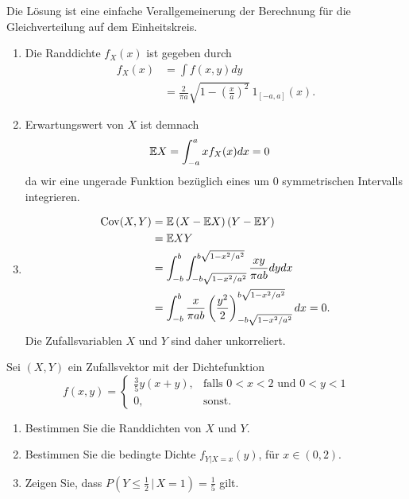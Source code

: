 \solution 
Die Lösung ist eine einfache Verallgemeinerung der Berechnung für die Gleichverteilung
auf dem Einheitskreis.
\begin{enumerate}
    \item Die Randdichte $f_{X}(x)$ ist gegeben durch
        \begin{align*}
            f_{X}(x) &= \int f(x,y) dy \\
            &= \frac{2}{\pi a} \sqrt{1- \left( \frac{x}{a} \right)^2} \ 1_{[-a,a]}(x).
        \end{align*}
    \item Erwartungswert von $X$ ist demnach
        \begin{align*}
            \mathbb{E} X &= \int_{-a}^{a} x f_{X}(x) dx = 0
        \end{align*}
        da wir eine ungerade Funktion bezüglich eines um $0$ symmetrischen 
        Intervalls integrieren.
    \item 
        \begin{align*}
            \operatorname{Cov}(X,Y) &= \mathbb{E} \left( X-\mathbb{E} X \right)\left( Y- \mathbb{E} Y \right) \\
            &= \mathbb{E} XY \\
            &= \int_{-b}^{b} \int_{-b\sqrt{1- x^2/a^2}}^{b\sqrt{1-x^2/a^2}} \frac{xy}{\pi ab} dy dx \\
            &= \int_{-b}^{b} \frac{x}{ \pi ab} \left( \frac{y^2}{2} \right)^{b\sqrt{1-x^{2}/a^2}}_{-b\sqrt{1-x^{2}/a^2}} dx = 0.
        \end{align*}
        Die Zufallsvariablen $X$ und $Y$ sind daher unkorreliert.
\end{enumerate}


 Sei $(X,Y)$ ein 
Zufallsvektor mit der Dichtefunktion
\begin{equation*}
    f(x,y) = \begin{cases}
        \frac{3}{5}y(x+y), & \text{falls } 0<x<2 \text{ und } 0<y<1 \\
        0,& \text{sonst.}
    \end{cases}
\end{equation*}
\begin{enumerate}
    \item Bestimmen Sie die Randdichten von $X$ und $Y$. 
    \item Bestimmen Sie die bedingte Dichte $f_{Y|X=x}(y)$, für $x\in (0,2)$. 
    \item Zeigen Sie, dass $P( Y \leq \frac{1}{2} \,|\, X=1) = \frac{1}{5}$ gilt.
\end{enumerate}

